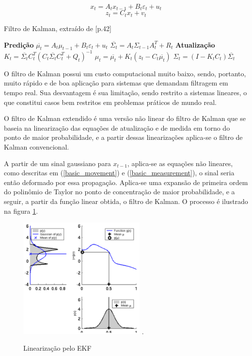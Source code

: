 \documentclass[paper=a4, fontsize=11pt]{scrartcl}
\begin{document}
\begin{equation}
    \label{linear_movement}
    x_t=A_t x_{t-1} + B_t\varepsilon_t + u_t
\end{equation}
\begin{equation}
    \label{linear_measurement}
    z_t = C_t x_t + v_t
\end{equation}

\begin{algorithm} 
\caption{Filtro de Kalman, extraído de  [\cite{P.Robotics}p.42]}
\label{alg1}
\begin{algorithmic}[1]
\State \textbf{Predição}
\State $\overline{\mu_t} = A_t \mu_{t-1} + B_t\varepsilon_t + u_t$
\State $\overline{\Sigma_t} = A_t\Sigma_{t-1}A_t^{T}+R_t$
\State \textbf{Atualização}
\State $K_t=\overline{\Sigma_t}C_t^{T}(C_t\overline{\Sigma_t}C_t^{T}+Q_t)^{-1}$
\State $\mu_t = \overline{\mu_t} + K_t(z_t-C_t\overline{\mu_t})$
\State $\Sigma_t=(I-K_t C_t)\overline{\Sigma_t}$
\EndFunction
\end{algorithmic}
\end{algorithm}

O filtro de Kalman possui um custo computacional muito baixo, sendo, portanto, muito rápido e de boa aplicação para sistemas que demandam filtragem em tempo real. Sua desvantagem é sua limitação, sendo restrito a sistemas lineares, o que constitui casos bem restritos em problemas práticos de mundo real.

O filtro de Kalman extendido \cite{Optimal_Filtering} é uma versão não linear do filtro de Kalman que se baseia na linearização das equações de atualização e de medida em torno do ponto de maior probabilidade, e a partir dessas linearizações aplica-se o filtro de Kalman convencional.

A partir de um sinal gaussiano para $x_{t-1}$, aplica-se as equações não lineares, como descritas em (\ref{basic_movement}) e (\ref{basic_measurement}), o sinal seria então deformado por essa propagação. Aplica-se uma expansão de primeira ordem do polinômio de Taylor no ponto de concentração de maior probabilidade, e a seguir, a partir da função linear obtida, o filtro de Kalman. O processo é ilustrado na figura \ref{linearization}.

\begin{figure}[!t]
\centering
\includegraphics[width=2.5in]{LinearizacaoEKF.png}
\DeclareGraphicsExtensions.
\caption{Linearização pelo EKF}
\label{linearization}
\end{figure}
\end{document}
